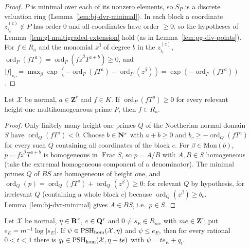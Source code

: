 \begin{proof}
$P$ is minimal over each of its nonzero elements, so $S_P$ is a discrete valuation ring (Lemma~\ref{lem:bj-dvr-minimal}). In each block a coordinate
$z^{(c)}_{i_c}\notin P$ has order $0$ and all coordinates have order $\ge0$, so the hypotheses of Lemma~\ref{lem:gl-multigraded-extension} hold (as in
Lemma~\ref{lem:pg-div-points}). For $f\in R_a$ and the monomial $z^\beta$ of degree $b$ in the $z^{(c)}_{i_c}$, $\operatorname{ord}_P(fT^a)=
\operatorname{ord}_P(f\tilde z^\beta T^{a+b})\ge0$, and $|f|_{v_P}=\max_\beta\exp(-\operatorname{ord}_P(fT^a)-\operatorname{ord}_P(z^\beta))=\exp(-\operatorname{ord}_P(fT^a))$.
\end{proof}

\begin{lemma}\label{lem:gl-section-criterion}
\leanok
{}
Let $\mathcal X$ be normal, $a\in\mathbf Z^r$ and $f\in K$. If $\operatorname{ord}_P(fT^a)\ge0$ for every relevant height-one multihomogeneous prime $P$, then
$f\in R_a$.
\end{lemma}

\begin{proof}
Only finitely many height-one primes $Q$ of the Noetherian normal domain $S$ have $\operatorname{ord}_Q(fT^a)<0$. Choose $b\in\mathbf{N}^r$ with $a+b\ge0$ and
$b_c\ge-\operatorname{ord}_Q(fT^a)$ for every such $Q$ containing all coordinates of the block $c$. For $\beta\in\mathrm{Mon}(b)$, $p=f\tilde z^\beta T^{a+b}$ is
homogeneous in $\operatorname{Frac}S$, so $p=A/B$ with $A,B\in S$ homogeneous (take the extremal homogeneous component of a denominator). The minimal primes $Q$ of
$BS$ are homogeneous of height one, and $\operatorname{ord}_Q(p)=\operatorname{ord}_Q(fT^a)+\operatorname{ord}_Q(z^\beta)\ge0$: for relevant $Q$ by hypothesis, for
irrelevant $Q$ (containing a whole block $c$) because $\operatorname{ord}_Q(z^\beta)\ge b_c$. Lemma~\ref{lem:bj-dvr-minimal} gives $A\in BS$, i.e.\ $p\in S$.
\end{proof}

\begin{lemma}\label{lem:gl-fixed-coefficient-division}
\leanok
{}
Let $\mathcal X$ be normal, $\eta\in\mathbf{R}^r$, $e\in\mathbf{Q}^r$ and $0\ne s_E\in R_{me}$ with $me\in\mathbf Z^r$; put $e_E=m^{-1}\log|s_E|$. If
$\psi\in\operatorname{PSH}_{\mathrm{hom}}(\mathcal X,\eta)$ and $\psi\le e_E$, then for every rational $0<t<1$ there is $q_t\in\operatorname{PSH}_{\mathrm{hom}}(\mathcal X,\eta-te)$ with
$\psi=te_E+q_t$.
\end{lemma}

